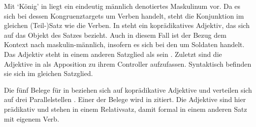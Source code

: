 
Mit  `König' in  liegt ein eindeutig
männlich denotiertes Maskulinum vor. Da es sich bei dessen
Kongruenztargets um Verben handelt, steht die Konjunktion im gleichen
(Teil-)Satz wie die Verben. In  steht ein
koprädikatives Adjektiv, das sich auf das Objekt des
Satzes bezieht. Auch in diesem Fall ist der Bezug dem Kontext nach
maskulin-männlich, insofern es sich bei den  um Soldaten
handelt. Das Adjektiv steht in einem anderen Satzglied
als sein . Zuletzt sind die Adjektive in
 als Apposition zu ihrem Controller
aufzufassen. Syntaktisch befinden sie sich im gleichen Satzglied.

Die fünf Belege für  in  beziehen sich auf
koprädikative Adjektive und verteilen sich auf drei
Parallelstellen%
. Einer der Belege wird in  zitiert. Die Adjektive sind
hier prädikativ und stehen in einem Relativsatz, damit
formal in einem anderen Satz mit eigenem Verb.

